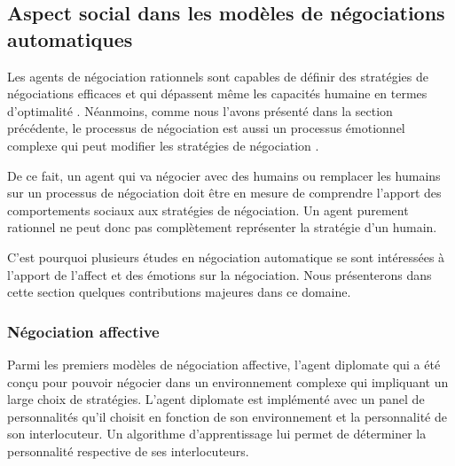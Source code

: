 		
	
		
		
	\subsection{Aspect social dans les modèles de négociations automatiques}
	
	Les agents de négociation rationnels sont capables de définir des stratégies de négociations efficaces et qui dépassent même les capacités humaine en termes d'optimalité \cite{jonker2012negotiating}. Néanmoins, comme nous l'avons présenté dans la section précédente, le processus de négociation est aussi un processus émotionnel complexe qui peut modifier les stratégies de négociation \cite{broekens2010affective}. 
	
	De ce fait, un agent qui va négocier avec des humains ou remplacer les humains sur un processus de négociation doit être en mesure de comprendre l'apport des comportements sociaux aux stratégies de négociation. Un agent purement rationnel ne peut donc pas complètement représenter la stratégie d'un humain. 
	
	C'est pourquoi plusieurs études en négociation automatique se sont intéressées à l'apport de l'affect et des émotions sur la négociation. Nous présenterons dans cette section quelques contributions majeures dans ce domaine. 
	
	\subsubsection{Négociation affective}
	
	Parmi les premiers modèles de négociation affective, l'agent diplomate \cite{kraus1995designing} qui a été conçu pour pouvoir négocier dans un environnement complexe qui impliquant un large choix de stratégies. L'agent diplomate est implémenté avec un panel de personnalités qu'il choisit en fonction de son environnement et la personnalité de son interlocuteur.  Un algorithme d'apprentissage lui permet de déterminer la personnalité respective de ses interlocuteurs. 
	
